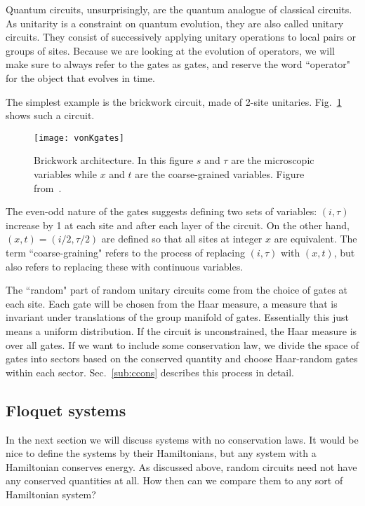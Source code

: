 \documentclass[a4paper,12pt]{article}
\renewcommand{\t}{\tau}
\begin{document}
Quantum circuits, unsurprisingly, are the quantum analogue of classical circuits. As unitarity is a constraint on quantum evolution, they are also called unitary circuits. They consist of successively applying unitary operations to local pairs or groups of sites. Because we are looking at the evolution of operators, we will make sure to always refer to the gates as gates, and reserve the word ``operator" for the object that evolves in time.

The simplest example is the brickwork circuit, made of 2-site unitaries. Fig.~\ref{fig:vonKgates} shows such a circuit.
\begin{figure}
	\centering
	\texttt{[image: vonKgates]}
	\caption{Brickwork architecture. In this figure $s$ and $\tau$ are the microscopic variables while $x$ and $t$ are the coarse-grained variables. Figure from~\cite{vonKeyserlingkHydro}.}
	\label{fig:vonKgates}
\end{figure}
The even-odd nature of the gates suggests defining two sets of variables: $(i,\t)$ increase by 1 at each site and after each layer of the circuit. On the other hand, $(x,t) = (i/2,\t/2)$ are defined so that all sites at integer $x$ are equivalent. The term ``coarse-graining" refers to the process of replacing $(i,\t)$ with $(x,t)$, but also refers to replacing these with continuous variables.

The ``random" part of random unitary circuits come from the choice of gates at each site. Each gate will be chosen from the Haar measure, a measure that is invariant under translations of the group manifold of gates. Essentially this just means a uniform distribution. If the circuit is unconstrained, the Haar measure is over all gates. If we want to include some conservation law, we divide the space of gates into sectors based on the conserved quantity and choose Haar-random gates within each sector. Sec.~\ref{sub:ccons} describes this process in detail.

\subsection{Floquet systems} \label{sub:floq}

In the next section we will discuss systems with no conservation laws. It would be nice to define the systems by their Hamiltonians, but any system with a Hamiltonian conserves energy. As discussed above, random circuits need not have any conserved quantities at all. How then can we compare them to any sort of Hamiltonian system?
\end{document}
